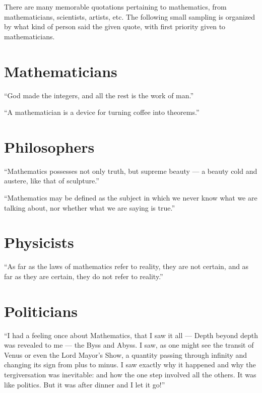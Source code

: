 \documentclass[12pt]{article}
\begin{document}
There are many memorable quotations pertaining to mathematics, from mathematicians, scientists, artists, etc. The following small sampling is organized by what kind of person said the given quote, with first priority given to mathematicians.

\section{Mathematicians}

``God made the integers, and all the rest is the work of man.''\\

``A mathematician is a device for turning coffee into theorems.''\\

\section{Philosophers}

``Mathematics possesses not only truth, but supreme beauty --- a beauty cold and austere, like that of sculpture.''\\

``Mathematics may be defined as the subject in which we never know what we are talking about, nor whether what we are saying is true.''\\

\section{Physicists}

``As far as the laws of mathematics refer to reality, they are not certain, and as far as they are certain, they do not refer to reality.''\\

\section{Politicians}

``I had a feeling once about Mathematics, that I saw it all --- Depth beyond depth was revealed to me --- the Byss and Abyss. I saw, as one might see the transit of Venus or even the Lord Mayor's Show, a quantity passing through infinity and changing its sign from plus to minus. I saw exactly why it happened and why the tergiversation was inevitable: and how the one step involved all the others. It was like politics. But it was after dinner and I let it go!''\\
\end{document}
